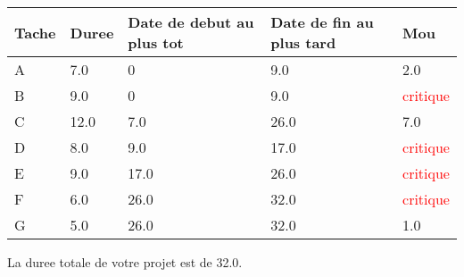 \documentclass{article}
\begin{document}
\begin{tabular}{|l|l|l|l|l|}
\hline 
Tache & Duree & Date de debut au plus tot & Date de fin au plus tard & Mou\tabularnewline
\hline

A&7.0&0&9.0&2.0\tabularnewline
\hline
B&9.0&0&9.0&\textcolor{red}{critique}\tabularnewline
\hline
C&12.0&7.0&26.0&7.0\tabularnewline
\hline
D&8.0&9.0&17.0&\textcolor{red}{critique}\tabularnewline
\hline
E&9.0&17.0&26.0&\textcolor{red}{critique}\tabularnewline
\hline
F&6.0&26.0&32.0&\textcolor{red}{critique}\tabularnewline
\hline
G&5.0&26.0&32.0&1.0\tabularnewline
\hline

\end{tabular}
La duree totale de votre projet est de 32.0.
\end{document}
